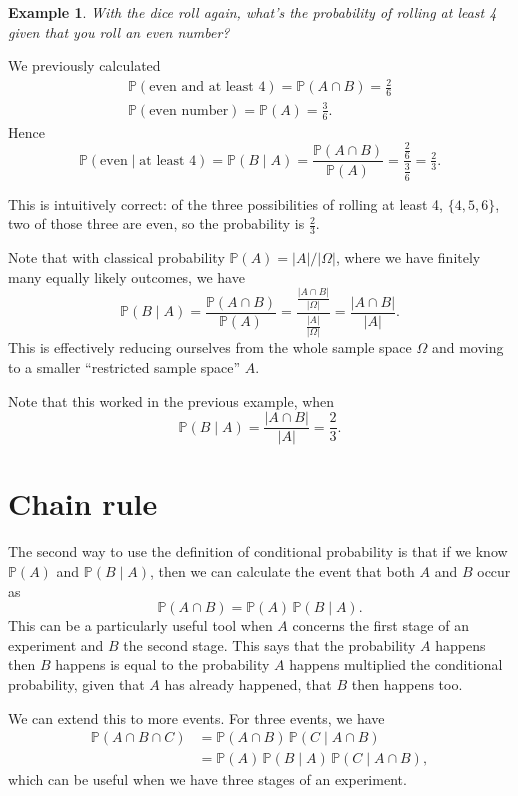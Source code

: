 \documentclass[
  a4paper,
]{book}
\theoremstyle{definition}
\theoremstyle{definition}
\newtheorem{example}{Example}[chapter]
\theoremstyle{definition}
\theoremstyle{definition}
\theoremstyle{remark}
\begin{document}
\begin{example}
\emph{With the dice roll again, what's the probability of rolling at least 4 given that you roll an even number?}

We previously calculated
\begin{gather*}
\mathbb P(\text{even and at least 4}) = \mathbb P(A \cap B) = \tfrac{2}{6} \\
\mathbb P(\text{even number}) = \mathbb P(A) = \tfrac{3}{6} .
\end{gather*}
Hence
\[ \mathbb P(\text{even} \mid \text{at least 4}) = \mathbb P(B \mid A) = \frac{\mathbb P(A \cap B)}{\mathbb P(A)} = \frac{\frac26}{\frac36} = \tfrac23 . \]

This is intuitively correct: of the three possibilities of rolling at least 4, \(\{4,5,6\}\), two of those three are even, so the probability is \(\frac23\).
\end{example}

Note that with classical probability \(\mathbb P(A) = |A|/|\Omega|\), where we have finitely many equally likely outcomes, we have
\[ \mathbb P(B \mid A) = \frac{\mathbb P(A \cap B)}{\mathbb P(A)} = \frac{\frac{|A\cap B|}{|\Omega|}}{\frac{|A|}{|\Omega|}} = \frac{|A \cap B|}{|A|} . \]
This is effectively reducing ourselves from the whole sample space \(\Omega\) and moving to a smaller ``restricted sample space'' \(A\).

Note that this worked in the previous example, when
\[ \mathbb P(B \mid A) = \frac{|A \cap B|}{|A|} = \frac{2}{3} . \]

\hypertarget{chain-rule}{%
\section{Chain rule}\label{chain-rule}}

The second way to use the definition of conditional probability is that if we know \(\mathbb P(A)\) and \(\mathbb P(B \mid A)\), then we can calculate the event that both \(A\) and \(B\) occur as
\[ \mathbb P(A \cap B) = \mathbb P(A)\, \mathbb P(B \mid A). \]
This can be a particularly useful tool when \(A\) concerns the first stage of an experiment and \(B\) the second stage. This says that the probability \(A\) happens then \(B\) happens is equal to the probability \(A\) happens multiplied the conditional probability, given that \(A\) has already happened, that \(B\) then happens too.

We can extend this to more events. For three events, we have
\begin{align*}
\mathbb P(A \cap B \cap C)
  &= \mathbb P(A \cap B) \, \mathbb P(C \mid A \cap B) \\
  &= \mathbb P(A) \, \mathbb P(B \mid A)\, \mathbb P(C \mid A \cap B) ,
\end{align*}
which can be useful when we have three stages of an experiment.
\end{document}
